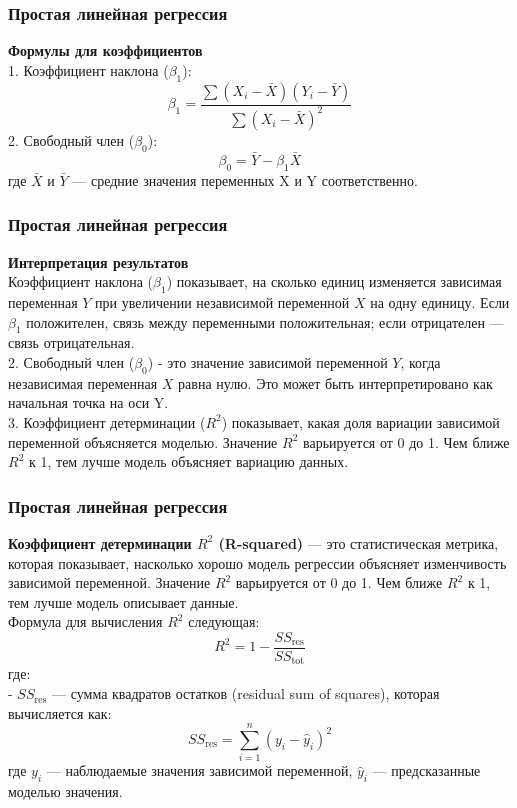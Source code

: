 \documentclass[aspectratio=169]{beamer}
\begin{document}
\begin{frame}
\frametitle{Простая линейная регрессия}
{\bf Формулы для коэффициентов}\\
1. Коэффициент наклона (\( \beta_1 \)):
\[
\beta_1 = \frac{\sum (X_i - \bar{X})(Y_i - \bar{Y})}{\sum (X_i - \bar{X})^2}
\]
2. Свободный член (\( \beta_0 \)):
\[
\beta_0 = \bar{Y} - \beta_1 \bar{X}
\]
где \( \bar{X} \) и \( \bar{Y} \) — средние значения переменных X и Y соответственно.
\end{frame}

\begin{frame}
\frametitle{Простая линейная регрессия}
{\bf Интерпретация результатов}\\
Коэффициент наклона (\( \beta_1 \)) показывает, на сколько единиц изменяется зависимая переменная \( Y \) при увеличении независимой переменной \( X \) на одну единицу. Если \( \beta_1 \) положителен, связь между переменными положительная; если отрицателен — связь отрицательная.\\
2. Свободный член (\( \beta_0 \)) - это значение зависимой переменной \( Y \), когда независимая переменная \( X \) равна нулю. Это может быть интерпретировано как начальная точка на оси Y.\\
3. Коэффициент детерминации (\( R^2 \)) показывает, какая доля вариации зависимой переменной объясняется моделью. Значение \( R^2 \) варьируется от 0 до 1. Чем ближе \( R^2 \) к 1, тем лучше модель объясняет вариацию данных.
\end{frame}

\begin{frame}
\frametitle{Простая линейная регрессия}
{\bf Коэффициент детерминации \( R^2 \) (R-squared)} — это статистическая метрика, которая показывает, насколько хорошо модель регрессии объясняет изменчивость зависимой переменной. Значение \( R^2 \) варьируется от 0 до 1. Чем ближе \( R^2 \) к 1, тем лучше модель описывает данные.\\
Формула для вычисления \( R^2 \) следующая:
\[
R^2 = 1 - \frac{SS_{\text{res}}}{SS_{\text{tot}}}
\]
где:\\
- \( SS_{\text{res}} \) — сумма квадратов остатков (residual sum of squares), которая вычисляется как:
\[
SS_{\text{res}} = \sum_{i=1}^{n} (y_i - \hat{y}_i)^2
\] 
где \( y_i \) — наблюдаемые значения зависимой переменной, \( \hat{y}_i \) — предсказанные моделью значения.
\end{frame}
\end{document}
